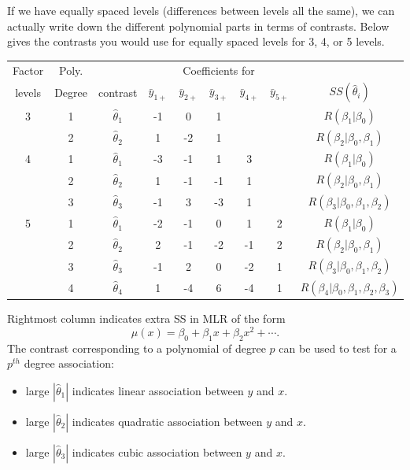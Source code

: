 \newpage 
If we have equally spaced levels (differences between levels all the same), we can actually write down the different polynomial parts in terms of contrasts.  Below gives the contrasts you would use for equally spaced levels for 3, 4, or 5 levels.
\begin{center}
\begin{tabular}{ccc|ccccc|c}
Factor& Poly.& & \multicolumn{5}{c|}{Coefficients for} & \\
levels & Degree & contrast & $\bar{y}_{1+}$ & $\bar{y}_{2+}$ & $\bar{y}_{3+}$ & $\bar{y}_{4+}$ & $\bar{y}_{5+}$ & $SS(\hat\theta_i)$\\ \hline
3 & 1 &$\hat\theta_1$& -1 & 0 & 1 & & & $R(\beta_1|\beta_0)$\\
  & 2 &$\hat\theta_2$& 1 & -2 & 1 & & & $R(\beta_2|\beta_0,\beta_1)$\\ \hline
4 & 1 &$\hat\theta_1$& -3 & -1 & 1 & 3 & & $R(\beta_1|\beta_0)$\\
  & 2 &$\hat\theta_2$& 1 & -1 & -1 & 1 & & $R(\beta_2|\beta_0,\beta_1)$\\ 
  & 3 &$\hat\theta_3$& -1 & 3 & -3 & 1 & & $R(\beta_3|\beta_0,\beta_1,\beta_2)$\\  \hline
5 & 1 &$\hat\theta_1$& -2 & -1 & 0 & 1 & 2 & $R(\beta_1|\beta_0)$\\
  & 2 &$\hat\theta_2$& 2 & -1 & -2 & -1 & 2 & $R(\beta_2|\beta_0,\beta_1)$\\
  & 3 &$\hat\theta_3$& -1 & 2 & 0 & -2 & 1 & $R(\beta_3|\beta_0,\beta_1,\beta_2)$\\
  & 4 &$\hat\theta_4$& 1 & -4 & 6 & -4 & 1 & $R(\beta_4|\beta_0,\beta_1,\beta_2,\beta_3)$\\ \hline
\end{tabular}
\end{center}

Rightmost column indicates extra SS in MLR of the form
$$\mu(x) = \beta_0 + \beta_1 x + \beta_2 x^2 + \cdots.$$
The contrast corresponding to a polynomial of degree $p$
can be used to test for a $p^{th}$ degree association:

\begin{itemize}
\item large $|\hat\theta_1|$ indicates
linear association between $y$ and $x$.
\item large $|\hat\theta_2|$ indicates
quadratic association between $y$ and $x$.
\item large $|\hat\theta_3|$ indicates 
cubic association between $y$ and $x$.
\end{itemize}

